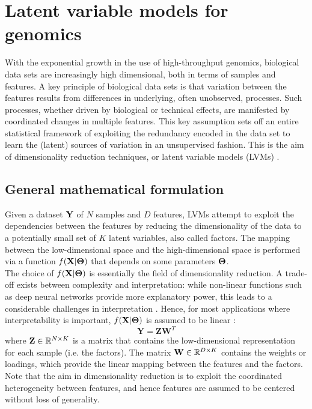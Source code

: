 \section{Latent variable models for genomics}
With the exponential growth in the use of high-throughput genomics, biological data sets are increasingly high dimensional, both in terms of samples and features. A key principle of biological data sets is that variation between the features results from differences in underlying, often unobserved, processes. Such processes, whether driven by biological or technical effects, are manifested by coordinated changes in multiple features. This key assumption sets off an entire statistical framework of exploiting the redundancy encoded in the data set to learn the (latent) sources of variation in an unsupervised fashion. This is the aim of dimensionality reduction techniques, or latent variable models (LVMs) \cite{Komili2008, Stegle2012, Leek2007, Pournara2007, Dai2017, Genevieve2018, Meng2016}.

\subsection{General mathematical formulation}
Given a dataset ${\bf Y}$ of $N$ samples and $D$ features, LVMs attempt to exploit the dependencies between the features by reducing the dimensionality of the data to a potentially small set of $K$ latent variables, also called factors. The mapping between the low-dimensional space and the high-dimensional space is performed via a function $f({\bf X}|\mbox{\boldmath $\Theta$})$ that depends on some parameters $\mbox{\boldmath $\Theta$}$.\\
The choice of $f({\bf X}|\mbox{\boldmath $\Theta$})$ is essentially the field of dimensionality reduction. A trade-off exists between complexity and interpretation: while non-linear functions such as deep neural networks provide more explanatory power, this leads to a considerable challenges in interpretation \cite{Zhang2018_NN}. Hence, for most applications where interpretability is important, $f({\bf X}|\mbox{\boldmath $\Theta$})$ is assumed to be linear \cite{XX}:
\begin{equation} \label{eq:linear_model}
	\mathbf{Y} = \mathbf{Z}\mathbf{W}^{T}
\end{equation}
where ${\bf Z} \in \mathbb{R}^{N \times K}$ is a matrix that contains the low-dimensional representation for each sample (i.e. the factors). The matrix ${\bf W} \in \mathbb{R}^{D \times K}$ contains the weights or loadings, which provide the linear mapping between the features and the factors.\\
Note that the aim in dimensionality reduction is to exploit the coordinated heterogeneity between features, and hence features are assumed to be centered without loss of generality.

